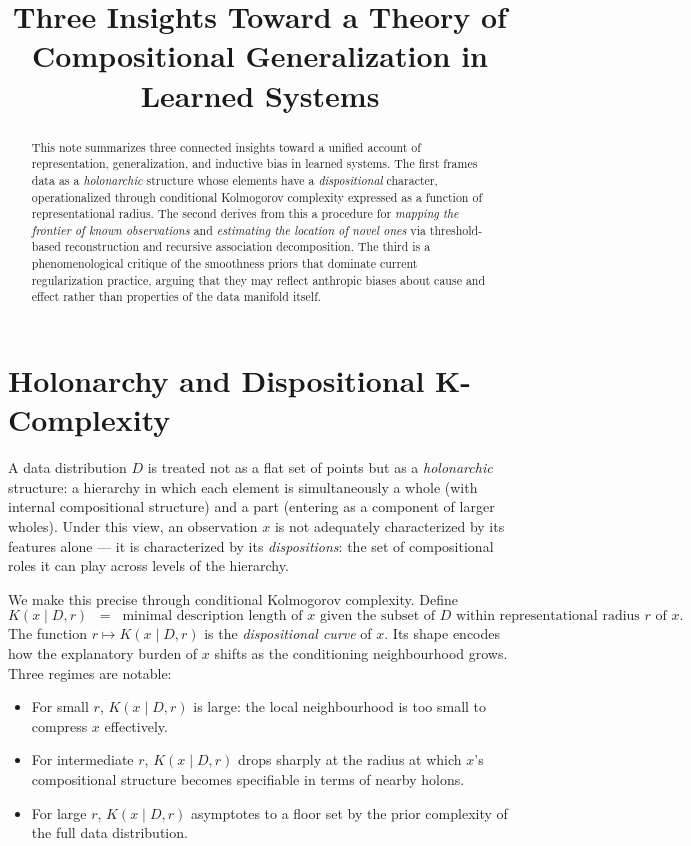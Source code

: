 \documentclass[11pt,a4paper]{article}
\title{Three Insights Toward a Theory of \\ Compositional Generalization in Learned Systems}
\author{}
\date{}
\begin{document}
\maketitle

\begin{abstract}
\noindent
This note summarizes three connected insights toward a unified account of representation,
generalization, and inductive bias in learned systems. The first frames data as a
\emph{holonarchic} structure whose elements have a \emph{dispositional} character,
operationalized through conditional Kolmogorov complexity expressed as a function of
representational radius. The second derives from this a procedure for \emph{mapping the
frontier of known observations} and \emph{estimating the location of novel ones} via
threshold-based reconstruction and recursive association decomposition. The third is a
phenomenological critique of the smoothness priors that dominate current regularization
practice, arguing that they may reflect anthropic biases about cause and effect rather
than properties of the data manifold itself.
\end{abstract}

\section{Holonarchy and Dispositional K-Complexity}

A data distribution $D$ is treated not as a flat set of points but as a
\emph{holonarchic} structure: a hierarchy in which each element is simultaneously a whole
(with internal compositional structure) and a part (entering as a component of larger
wholes). Under this view, an observation $x$ is not adequately characterized by its
features alone --- it is characterized by its \emph{dispositions}: the set of
compositional roles it can play across levels of the hierarchy.

We make this precise through conditional Kolmogorov complexity. Define
\[
  K(x \mid D, r) \;\;=\;\; \text{minimal description length of } x \text{ given the
  subset of } D \text{ within representational radius } r \text{ of } x.
\]
The function $r \mapsto K(x \mid D, r)$ is the \emph{dispositional curve} of $x$. Its
shape encodes how the explanatory burden of $x$ shifts as the conditioning neighbourhood
grows. Three regimes are notable:

\begin{itemize}
  \item For small $r$, $K(x \mid D, r)$ is large: the local neighbourhood is too small
        to compress $x$ effectively.
  \item For intermediate $r$, $K(x \mid D, r)$ drops sharply at the radius at which
        $x$'s compositional structure becomes specifiable in terms of nearby holons.
  \item For large $r$, $K(x \mid D, r)$ asymptotes to a floor set by the prior
        complexity of the full data distribution.
\end{itemize}
\end{document}
